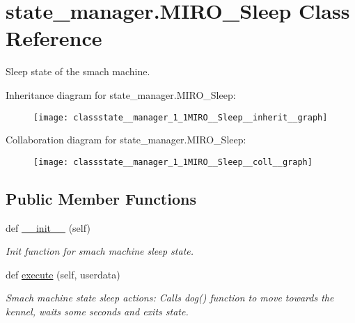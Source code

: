 \hypertarget{classstate__manager_1_1MIRO__Sleep}{}\section{state\+\_\+manager.\+M\+I\+R\+O\+\_\+\+Sleep Class Reference}
\label{classstate__manager_1_1MIRO__Sleep}


Sleep state of the smach machine.  




Inheritance diagram for state\+\_\+manager.\+M\+I\+R\+O\+\_\+\+Sleep\+:\nopagebreak
\begin{figure}[H]
\begin{center}
\leavevmode
\texttt{[image: classstate\_\_manager\_1\_1MIRO\_\_Sleep\_\_inherit\_\_graph]}
\end{center}
\end{figure}


Collaboration diagram for state\+\_\+manager.\+M\+I\+R\+O\+\_\+\+Sleep\+:\nopagebreak
\begin{figure}[H]
\begin{center}
\leavevmode
\texttt{[image: classstate\_\_manager\_1\_1MIRO\_\_Sleep\_\_coll\_\_graph]}
\end{center}
\end{figure}
\subsection*{Public Member Functions}
\begin{DoxyCompactItemize}
\item 
def \hyperlink{classstate__manager_1_1MIRO__Sleep_a1e0695b96023b2c827bd28d9b0c11bfb}{\+\_\+\+\_\+init\+\_\+\+\_\+} (self)
\begin{DoxyCompactList}\small\item\em Init function for smach machine sleep state. \end{DoxyCompactList}\item 
def \hyperlink{classstate__manager_1_1MIRO__Sleep_acda704c667aad40c16f10d7c705b1b2e}{execute} (self, userdata)
\begin{DoxyCompactList}\small\item\em Smach machine state sleep actions\+: Calls dog() function to move towards the kennel, waits some seconds and exits state. \end{DoxyCompactList}\end{DoxyCompactItemize}


